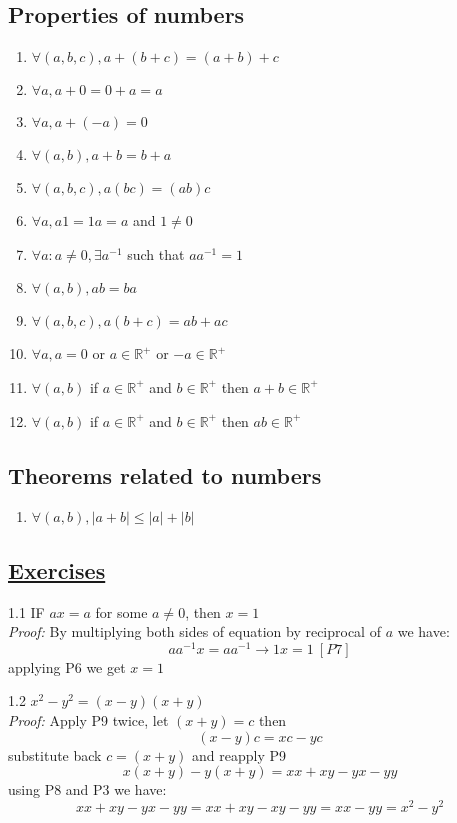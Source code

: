 \documentclass[a4paper, 11pt]{article}
\begin{document}
\subsection*{Properties of numbers}
\begin{enumerate}
  \item $\forall (a, b, c),  a + (b + c) = (a + b) + c$
  \item $\forall a,  a + 0 = 0 + a = a$
  \item $\forall a, a + (-a) = 0$
  \item $\forall (a, b), a + b = b + a$
  \item $\forall (a, b, c), a(bc) = (ab)c$
  \item $\forall a, a1 = 1a = a$ and $1 \ne 0$
  \item $\forall a: a \ne 0, \exists a^{-1}$ such that $aa^{-1} = 1$
  \item $\forall (a, b), ab = ba$
  \item $\forall (a, b, c), a(b + c) = ab + ac$
  \item $\forall a, a = 0$ or $a \in \mathbb{R}^+$ or $-a \in \mathbb{R}^+$
  \item $\forall (a, b)$ if $a \in \mathbb{R}^+$ and $b \in \mathbb{R}^+$ then $a + b \in \mathbb{R}^+$
  \item $\forall (a, b)$ if $a \in \mathbb{R}^+$ and $b \in \mathbb{R}^+$ then $ab \in \mathbb{R}^+$
\end{enumerate}

\subsection*{Theorems related to numbers}
\begin{enumerate}
  \item $\forall (a, b), |a + b| \leq |a| + |b|$
\end{enumerate}

\subsection*{\underline{Exercises}}
1.1 IF $ax = a$ for some $a \ne 0$, then $x = 1$\\
\emph{Proof:} 
By multiplying both sides of equation by reciprocal of $a$ we have:
$$aa^{-1}x = aa^{-1} \rightarrow 1x = 1 \ [P7]$$
applying P6 we get $x = 1$

\hrulefill

1.2 $x^2 - y^2 = (x - y)(x + y)$\\
\emph{Proof:}
Apply P9 twice, let $(x + y) = c$ then 
$$(x - y)c = xc - yc$$
substitute back $c = (x + y)$ and reapply P9
$$x(x + y) - y(x + y) = xx + xy - yx - yy$$
using P8 and P3 we have:
$$xx + xy - yx - yy = xx + xy - xy - yy = xx - yy = x^2 - y^2$$
\end{document}
